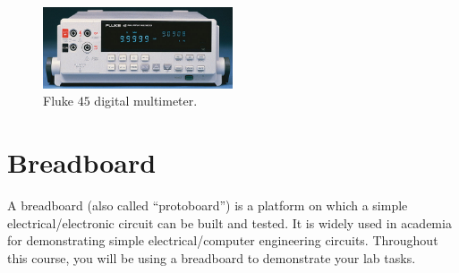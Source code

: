 \begin{figure}[h]
    \centering
    \includegraphics[width=0.5\textwidth]{figs/img/labs/fluke45.jpg}
    \caption{Fluke $45$ digital multimeter.}
    \label{fig:fluke45}
\end{figure}








\section{Breadboard}
\label{sec:breadboard}

A breadboard (also called ``protoboard'') is a platform on which a simple electrical/electronic circuit can be built and tested. It is widely used in academia for demonstrating simple electrical/computer engineering circuits. Throughout this course, you will be using a breadboard to demonstrate your lab tasks. 

